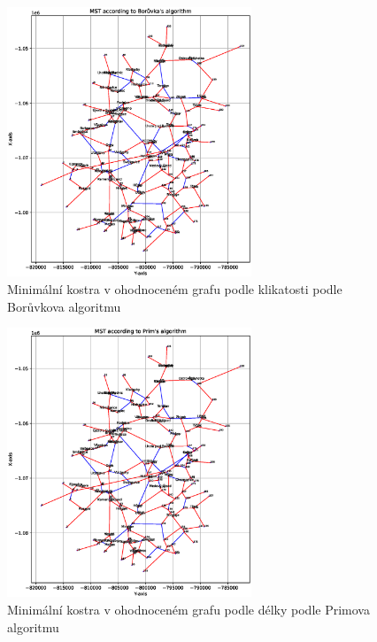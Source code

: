 \begin{figure}[H]
    \centering
    \includegraphics[width=0.65\textwidth]{images/Figure_3_curvature.eps}
    \caption{Minimální kostra v ohodnoceném grafu podle klikatosti podle Borůvkova algoritmu}
\end{figure}
\begin{figure}[H]
    \centering
    \includegraphics[width=0.65\textwidth]{images/Figure_2_curvature.eps}
    \caption{Minimální kostra v ohodnoceném grafu podle délky podle Primova algoritmu}
\end{figure}
